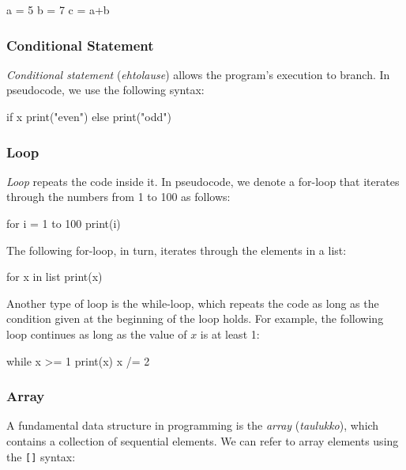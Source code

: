 \begin{code}
    a = 5
    b = 7
    c = a+b
\end{code}

\subsubsection{Conditional Statement}

\emph{Conditional statement} (\emph{ehtolause}) allows the program's execution to branch.
In pseudocode, we use the following syntax:


\begin{code}
    if x%
    print("even")
    else
    print("odd")
\end{code}

\subsubsection{Loop}

\emph{Loop} repeats the code inside it.
In pseudocode, we denote a for-loop that iterates through the numbers from 1 to 100 as follows:


\begin{code}
    for i = 1 to 100
    print(i)
\end{code}

The following for-loop, in turn, iterates through the elements in a list:


\begin{code}
    for x in list
    print(x)
\end{code}

Another type of loop is the while-loop, which repeats the code as long as the condition given at the beginning of the loop holds.
For example, the following loop continues as long as the value of $x$ is at least 1:


\begin{code}
    while x >= 1
    print(x)
    x /= 2
\end{code}

\subsubsection{Array}


A fundamental data structure in programming is the \emph{array} (\emph{taulukko}),
which contains a collection of sequential elements.
We can refer to array elements using the \texttt{[]} syntax:


